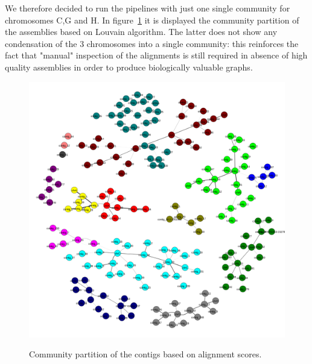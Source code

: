 We therefore decided to run the pipelines with just one single community for chromosomes C,G and H.
In figure~\ref{fig:lodelo_communities} it is displayed the community partition of the assemblies based on Louvain algorithm. The latter does not show any condensation of the 3 chromosomes into a single community: this reinforces the fact that "manual" inspection of the alignments is still required in absence of high quality assemblies in order to produce biologically valuable graphs.\\
\begin{figure}[t]
	\centering
	\includegraphics[width=.8\linewidth]{figures/alingment_communities.pdf}
	\label{fig:lodelo_communities}
	\caption{Community partition of the contigs based on alignment scores.}
\end{figure}

